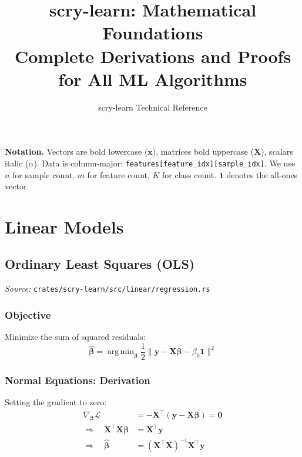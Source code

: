 \documentclass[11pt,a4paper]{article}
\title{\vspace{-1cm}\textbf{scry-learn: Mathematical Foundations}\\[0.3em]
\large Complete Derivations and Proofs for All ML Algorithms}
\author{scry-learn Technical Reference}
\date{}
\theoremstyle{definition}
\theoremstyle{remark}
\DeclareMathOperator*{\argmin}{arg\,min}
\begin{document}
\maketitle
\thispagestyle{fancy}

\noindent\textbf{Notation.} Vectors are bold lowercase ($\mathbf{x}$), matrices bold uppercase ($\mathbf{X}$), scalars italic ($\alpha$). Data is column-major: \texttt{features[feature\_idx][sample\_idx]}. We use $n$ for sample count, $m$ for feature count, $K$ for class count. $\mathbf{1}$ denotes the all-ones vector.

\tableofcontents
\newpage

\section{Linear Models}

\subsection{Ordinary Least Squares (OLS)}
\label{sec:ols}

\noindent\textit{Source:} \texttt{crates/scry-learn/src/linear/regression.rs}

\subsubsection*{Objective}

Minimize the sum of squared residuals:
\begin{equation}
\hat{\boldsymbol{\beta}} = \argmin_{\boldsymbol{\beta}} \frac{1}{2}\|\mathbf{y} - \mathbf{X}\boldsymbol{\beta} - \beta_0\mathbf{1}\|^2
\end{equation}

\subsubsection*{Normal Equations: Derivation}

Setting the gradient to zero:
\begin{align}
\nabla_{\boldsymbol{\beta}} \mathcal{L} &= -\mathbf{X}^\top(\mathbf{y} - \mathbf{X}\boldsymbol{\beta}) = \mathbf{0} \\
\Rightarrow \quad \mathbf{X}^\top\mathbf{X}\boldsymbol{\beta} &= \mathbf{X}^\top\mathbf{y} \\
\Rightarrow \quad \hat{\boldsymbol{\beta}} &= (\mathbf{X}^\top\mathbf{X})^{-1}\mathbf{X}^\top\mathbf{y}
\end{align}
\end{document}
